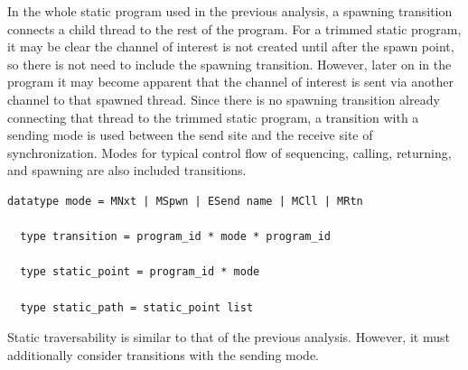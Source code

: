 \documentclass{article}
\begin{document}
In the whole static program used in the previous analysis, a spawning transition
connects a child thread to the rest of the program.  For a trimmed static program,
it may be clear the channel of interest is not created until after the spawn point,
so there is not need to include the spawning transition.  However, later on in the
program it may become apparent that the channel of interest is sent via another channel to
that spawned thread.  Since there is no spawning transition already connecting that
thread to the trimmed static program, a transition with a sending mode is used between the
send site and the receive site of synchronization. Modes for typical control flow of
sequencing, calling, returning, and spawning are also included transitions.

\begin{lstlisting}[language=logic, escapechar=\%]
  datatype mode = MNxt | MSpwn | ESend name | MCll | MRtn

  type transition = program_id * mode * program_id

  type static_point = program_id * mode

  type static_path = static_point list
\end{lstlisting}

Static traversability is similar to that of the previous analysis.
However, it must additionally consider transitions with the sending mode. 
\end{document}
